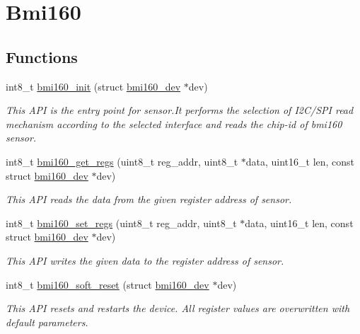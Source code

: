 \hypertarget{group__bmi160}{}\section{Bmi160}
\label{group__bmi160}
\subsection*{Functions}
\begin{DoxyCompactItemize}
\item 
int8\+\_\+t \hyperlink{group__bmi160_ga7a2e8b832a4cb12b441cba7371d73f6a}{bmi160\+\_\+init} (struct \hyperlink{structbmi160__dev}{bmi160\+\_\+dev} $\ast$dev)
\begin{DoxyCompactList}\small\item\em This A\+PI is the entry point for sensor.\+It performs the selection of I2\+C/\+S\+PI read mechanism according to the selected interface and reads the chip-\/id of bmi160 sensor. \end{DoxyCompactList}\item 
int8\+\_\+t \hyperlink{group__bmi160_ga9bebc4a575526f49e625a87de9478e04}{bmi160\+\_\+get\+\_\+regs} (uint8\+\_\+t reg\+\_\+addr, uint8\+\_\+t $\ast$data, uint16\+\_\+t len, const struct \hyperlink{structbmi160__dev}{bmi160\+\_\+dev} $\ast$dev)
\begin{DoxyCompactList}\small\item\em This A\+PI reads the data from the given register address of sensor. \end{DoxyCompactList}\item 
int8\+\_\+t \hyperlink{group__bmi160_ga5bea435582a9fdb2c331f64b61e0d6c5}{bmi160\+\_\+set\+\_\+regs} (uint8\+\_\+t reg\+\_\+addr, uint8\+\_\+t $\ast$data, uint16\+\_\+t len, const struct \hyperlink{structbmi160__dev}{bmi160\+\_\+dev} $\ast$dev)
\begin{DoxyCompactList}\small\item\em This A\+PI writes the given data to the register address of sensor. \end{DoxyCompactList}\item 
int8\+\_\+t \hyperlink{group__bmi160_gaa047f8bacbc2a9c14ff70841304c04d0}{bmi160\+\_\+soft\+\_\+reset} (struct \hyperlink{structbmi160__dev}{bmi160\+\_\+dev} $\ast$dev)
\begin{DoxyCompactList}\small\item\em This A\+PI resets and restarts the device. All register values are overwritten with default parameters. \end{DoxyCompactList}\item 

\end{DoxyCompactItemize}
